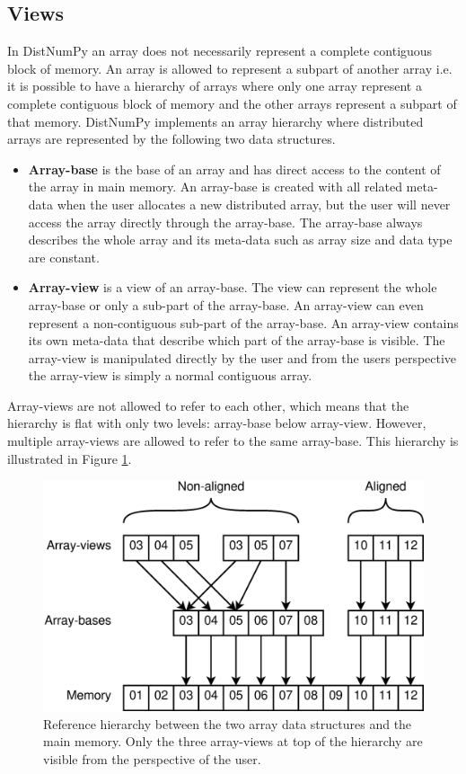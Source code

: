 \documentclass[preprint]{../PGAS10/sigplanconf}
\begin{document}
\subsection{Views}
In DistNumPy an array does not necessarily represent a complete contiguous block of memory. An array is allowed to represent a subpart of another array i.e. it is possible to have a hierarchy of arrays where only one array represent a complete contiguous block of memory and the other arrays represent a subpart of that memory. DistNumPy implements an array hierarchy where distributed arrays are represented by the following two data structures.
\begin{itemize}
\item \textbf{Array-base} is the base of an array and has direct access to the content of the array in main memory. An array-base is created with all related meta-data when the user allocates a new distributed array, but the user will never access the array directly through the array-base. The array-base always describes the whole array and its meta-data such as array size and data type are constant.
\item \textbf{Array-view} is a view of an array-base. The view can represent the whole array-base or only a sub-part of the array-base. An array-view can even represent a non-contiguous sub-part of the array-base. An array-view contains its own meta-data that describe which part of the array-base is visible. The array-view is manipulated directly by the user and from the users perspective the array-view is simply a normal contiguous array.
\end{itemize}
Array-views are not allowed to refer to each other, which means that the hierarchy is flat with only two levels: array-base below array-view. However, multiple array-views are allowed to refer to the same array-base. This hierarchy is illustrated in Figure \ref{fig:views}. 

\begin{figure}
 \centering
 \includegraphics[width=\linewidth]{gfx/views}
 \caption{Reference hierarchy between the two array data structures and the main memory. Only the three array-views at top of the hierarchy are visible from the perspective of the user.}
 \label{fig:views}
\end{figure}
\end{document}
